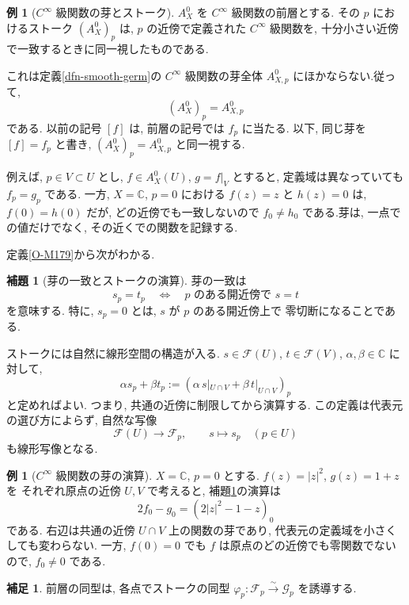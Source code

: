 \documentclass[dvipdfmx,a4paper,11pt]{article} %
\newcommand{\C}{\mathbb{C}}
\theoremstyle{definition}
\numberwithin{equation}{section}
\newtheorem{lem}[thm]{補題}
\newtheorem{rem}[thm]{補足}
\newtheorem{exa}[thm]{例}
\begin{document}
\begin{exa}[$C^\infty$ 級関数の芽とストーク]
$A_X^0$ を $C^\infty$ 級関数の前層とする.
その $p$ におけるストーク $(A_X^0)_p$ は, 
$p$ の近傍で定義された $C^\infty$ 級関数を, 
十分小さい近傍で一致するときに同一視したものである.

これは定義\ref{dfn-smooth-germ}の $C^\infty$ 級関数の芽全体
$A^0_{X,p}$ にほかならない.従って, 
\[
(A_X^0)_p=A^0_{X,p}
\]
である.
以前の記号 $[f]$ は, 前層の記号では $f_p$ に当たる.
以下, 同じ芽を $[f]=f_p$ と書き, $(A_X^0)_p=A^0_{X,p}$ と同一視する.


例えば, $p\in V\subset U$ とし, 
$f\in A_X^0(U)$, $g=f|_V$ とすると, 
定義域は異なっていても
\(
f_p=g_p
\)
である.
一方, $X=\C$, $p=0$ における $f(z)=z$ と $h(z)=0$ は, 
$f(0)=h(0)$ だが, どの近傍でも一致しないので
\(
f_0\neq h_0
\)
である.芽は, 一点での値だけでなく, その近くでの関数を記録する.
\end{exa}
定義\ref{O-M179}から次がわかる.
\begin{lem}[芽の一致とストークの演算]\label{lem-stalk-germs}
芽の一致は
\[
s_p=t_p
\quad\Longleftrightarrow\quad
p\text{ のある開近傍で }s=t
\]
を意味する.
特に, $s_p=0$ とは, $s$ が $p$ のある開近傍上で
零切断になることである.

ストークには自然に線形空間の構造が入る.
$s\in\mathcal F(U)$, $t\in\mathcal F(V)$, 
$\alpha,\beta\in\C$ に対して, 
\[
\alpha s_p+\beta t_p
:=
\left(\alpha\,s|_{U\cap V}
+\beta\,t|_{U\cap V}\right)_p
\]
と定めればよい.
つまり, 共通の近傍に制限してから演算する.
この定義は代表元の選び方によらず, 
自然な写像
\[
\mathcal F(U)\longrightarrow\mathcal F_p,\qquad
s\longmapsto s_p
\quad(p\in U)
\]
も線形写像となる.
\end{lem}

\begin{exa}[$C^\infty$ 級関数の芽の演算]
$X=\C$, $p=0$ とする. $f(z)=|z|^2$, $g(z)=1+z$ を
それぞれ原点の近傍 $U,V$ で考えると, 補題\ref{lem-stalk-germs}の演算は
\[
2f_0-g_0=(2|z|^2-1-z)_0
\]
である. 右辺は共通の近傍 $U\cap V$ 上の関数の芽であり,
代表元の定義域を小さくしても変わらない.
一方, $f(0)=0$ でも $f$ は原点のどの近傍でも零関数でないので,
$f_0\neq0$ である.
\end{exa}



\begin{rem}
前層の同型は, 各点でストークの同型
\(
\varphi_p:\mathcal F_p\xrightarrow{\sim}\mathcal G_p
\)
を誘導する.
\end{rem}
\end{document}
